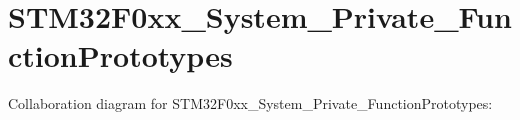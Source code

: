 \hypertarget{group___s_t_m32_f0xx___system___private___function_prototypes}{}\section{S\+T\+M32\+F0xx\+\_\+\+System\+\_\+\+Private\+\_\+\+Function\+Prototypes}
\label{group___s_t_m32_f0xx___system___private___function_prototypes}
Collaboration diagram for S\+T\+M32\+F0xx\+\_\+\+System\+\_\+\+Private\+\_\+\+Function\+Prototypes\+:

